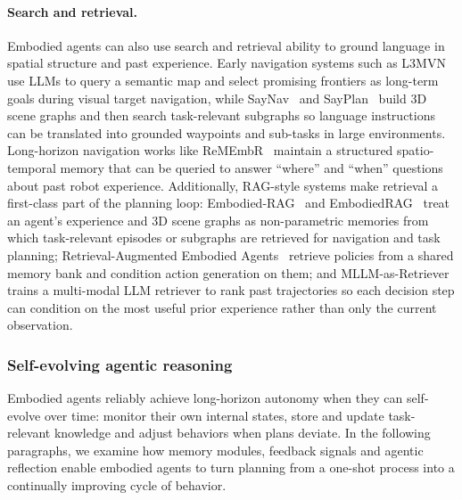 \paragraph{Search and retrieval.}

Embodied agents can also use search and retrieval ability to ground language in spatial structure and past experience. Early navigation systems such as L3MVN~\cite{yu2023l3mvn} use LLMs to query a semantic map and select promising frontiers as long-term goals during visual target navigation, while SayNav~\cite{rajvanshi2024saynav} and SayPlan~\cite{DBLP:conf/corl/RanaHGA0S23} build 3D scene graphs and then search task-relevant subgraphs so language instructions can be translated into grounded waypoints and sub-tasks in large environments. Long-horizon navigation works like ReMEmbR~\cite{anwar2025remembr} maintain a structured spatio-temporal memory that can be queried to answer “where” and “when” questions about past robot experience. Additionally, RAG-style systems make retrieval a first-class part of the planning loop: Embodied-RAG~\cite{quanting2024embodiedrag} and EmbodiedRAG~\cite{meghan2024embodiedrag} treat an agent’s experience and 3D scene graphs as non-parametric memories from which task-relevant episodes or subgraphs are retrieved for navigation and task planning; Retrieval-Augmented Embodied Agents~\cite{zhu2024retrieval} retrieve policies from a shared memory bank and condition action generation on them; and MLLM-as-Retriever~\cite{junpeng2024mllm} trains a multi-modal LLM retriever to rank past trajectories so each decision step can condition on the most useful prior experience rather than only the current observation.


\subsubsection{Self-evolving agentic reasoning}
\label{sec:app-embodied-evolve}



Embodied agents reliably achieve long-horizon autonomy when they can self-evolve over time: monitor their own internal states, store and update task-relevant knowledge and adjust behaviors when plans deviate. In the following paragraphs, we examine how memory modules, feedback signals and agentic reflection enable embodied agents to turn planning from a one-shot process into a continually improving cycle of behavior.


